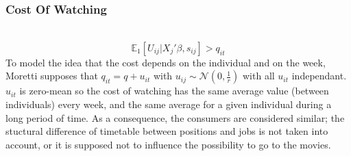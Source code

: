 	\subsubsection{Cost Of Watching}
	\\
	\begin{equation}
	\mathbb{E}_1[U_{i j}|X_{j}'\beta, s_{i j}]>q_{i t}
	\end{equation}
	To model the idea that the cost depends on the individual and on the week, Moretti supposes that $q_{i t}=q+u_{i t}$ with $u_{i j}\sim \mathcal{N}(0,\frac{1}{r})$ with all $u_{i t}$ independant. $u_{i t}$ is zero-mean so the cost of watching has the same average value (between individuals) every week, and the same average for a given individual during a long period of time. As a consequence, the consumers are considered similar; the stuctural difference of timetable between positions and jobs is not taken into account, or it is supposed not to influence the possibility to go to the movies.\\
	
